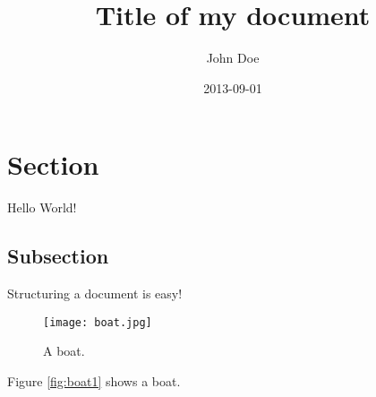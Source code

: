 \documentclass{article}
\title{Title of my document}
\date{2013-09-01}
\author{John Doe}
\begin{document}
\maketitle
{}
\newpage
{}

\section{Section}

Hello World!

\subsection{Subsection}

Structuring a document is easy!

\begin{figure}
  \texttt{[image: boat.jpg]}
  \caption{A boat.}
\end{figure}

Figure \ref{fig:boat1} shows a boat.
\end{document}

